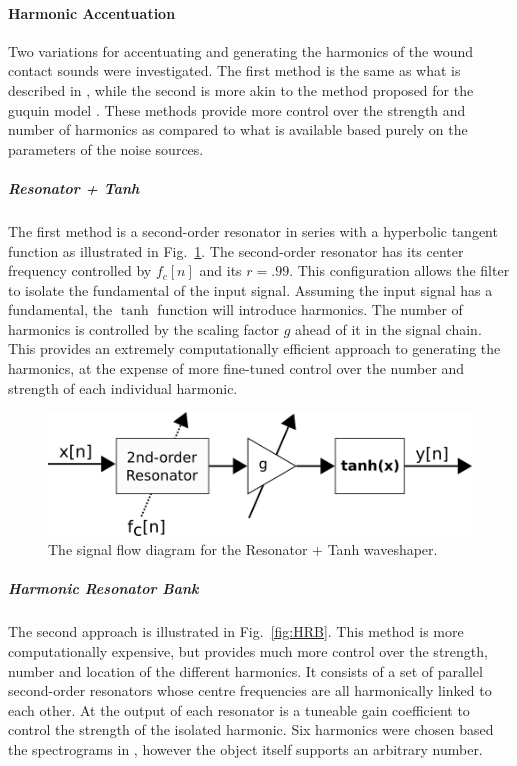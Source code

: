 \documentclass[../main.tex]{subfiles}
\begin{document}
\paragraph{Harmonic Accentuation}
Two variations for accentuating and generating the harmonics of the wound contact sounds were investigated. The first method is the same as what is described in , while the second is more akin to the method proposed for the guquin model . These methods provide more control over the strength and number of harmonics as compared to what is available based purely on the parameters of the noise sources.

\subparagraph{Resonator + Tanh}
The first method is a second-order resonator in series with a hyperbolic tangent function as illustrated in Fig.~\ref{fig:ResoTanh}. The second-order resonator has its center frequency controlled by $f_c[n]$ and its $r = .99$. This configuration allows the filter to isolate the fundamental of the input signal. Assuming the input signal has a fundamental, the $\tanh$ function will introduce harmonics. The number of harmonics is controlled by the scaling factor $g$ ahead of it in the signal chain. This provides an extremely computationally efficient approach to generating the harmonics, at the expense of more fine-tuned control over the number and strength of each individual harmonic.

\begin{figure}[h]
    \centering
    \includegraphics[scale=.5]{./images/diagrams/ResoTanh.png}
    \caption{The signal flow diagram for the Resonator + Tanh waveshaper.}
    \label{fig:ResoTanh}
\end{figure}

\subparagraph{Harmonic Resonator Bank}
The second approach is illustrated in Fig.~\ref{fig:HRB}. This method is more computationally expensive, but provides much more control over the strength, number and location of the different harmonics. It consists of a set of parallel second-order resonators whose centre frequencies are all harmonically linked to each other. At the output of each resonator is a tuneable gain coefficient to control the strength of the isolated harmonic. Six harmonics were chosen based the spectrograms in , however the object itself supports an arbitrary number.
\end{document}
